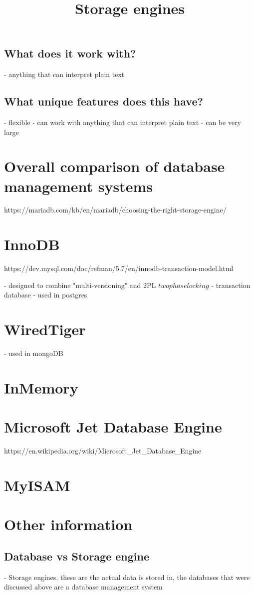 \section{What does it work with?}
- anything that can interpret plain text

\section{What unique features does this have?}
- flexible - can work with anything that can interpret plain text
- can be very large

\chapter{Overall comparison of database management systems}

\title{Storage engines}
https://mariadb.com/kb/en/mariadb/choosing-the-right-storage-engine/

\chapter{InnoDB}
https://dev.mysql.com/doc/refman/5.7/en/innodb-transaction-model.html

- designed to combine "multi-versioning" and 2PL \(two phase locking\)
- transaction database
- used in postgres

\chapter{WiredTiger}

- used in mongoDB

\chapter{InMemory}


\chapter{Microsoft Jet Database Engine}
https://en.wikipedia.org/wiki/Microsoft_Jet_Database_Engine

\chapter{MyISAM}


\chapter{Other information}

\section{Database vs Storage engine}
- Storage engines, these are the actual data is stored in, the databases that were discussed above are a database management system
